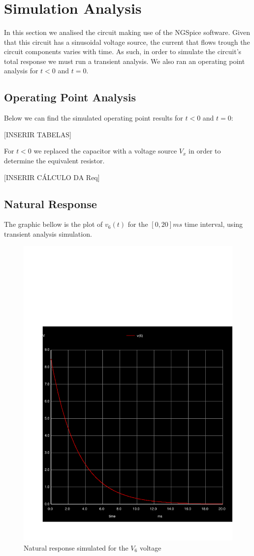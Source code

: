 \section{Simulation Analysis}
\label{sec:simulation}

\paragraph{} In this section we analised the circuit making use of the NGSpice software. Given that this circuit has a sinusoidal voltage source, the current that flows trough the circuit components varies with time.
As such, in order to simulate the circuit's total response we must run a transient analysis. We also ran an operating point analysis for $t < 0$ and $t = 0$.

\subsection{Operating Point Analysis}

Below we can find the simulated operating point results for  $t < 0$ and $t = 0$:

[INSERIR TABELAS]

For $t<0$ we replaced the capacitor with a voltage source $V_x$ in order to determine the equivalent resistor.

[INSERIR CÁLCULO DA Req]

\subsection{Natural Response}

The graphic bellow is the plot of $v_6(t)$ for the $[0, 20]ms$ time interval, using transient analysis simulation.

\begin{figure}[!h]
	\centering
	\includegraphics[width=0.7\linewidth]{../sim/natural.pdf}
	\caption{Natural response simulated for the $V_6$ voltage}
\end{figure}

